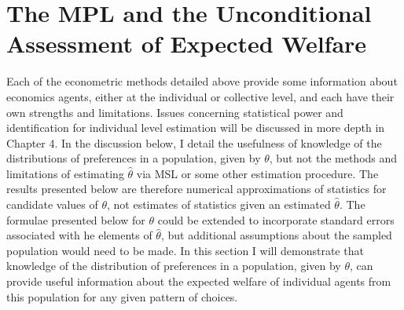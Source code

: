 \documentclass[../main.tex]{subfiles}
\begin{document}
\section{The \texorpdfstring{\textcite{Holt2002}}{Holt and Laury (2002)} MPL and the Unconditional Assessment of Expected Welfare}

Each of the econometric methods detailed above provide some information about economics agents, either at the individual or collective level, and each have their own strengths and limitations.
Issues concerning statistical power and identification for individual level estimation will be discussed in more depth in Chapter 4.
In the discussion below, I detail the usefulness of knowledge of the distributions of preferences in a population, given by $\theta$, but not the methods and limitations of estimating $\hat{\theta}$ via MSL or some other estimation procedure.
The results presented below are therefore numerical approximations of statistics for candidate values of $\theta$, not estimates of statistics given an estimated $\hat{\theta}$.
The formulae presented below for $\theta$ could be extended to incorporate standard errors associated with he elements of $\hat{\theta}$, but additional assumptions about the sampled population would need to be made.
In this section I will demonstrate that knowledge of the distribution of preferences in a population, given by $\theta$, can provide useful information about the expected welfare of individual agents from this population for any given pattern of choices.


\end{document}
